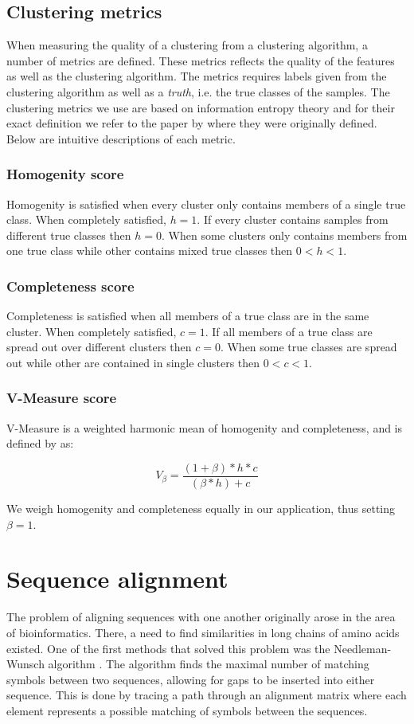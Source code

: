 \documentclass[a4paper]{report}
\begin{document}
\subsection{Clustering metrics}
\label{sec:metrics}
When measuring the quality of a clustering from a clustering algorithm, a
number of metrics are defined. These metrics reflects the quality of the
features as well as the clustering algorithm. The metrics requires labels
given from the clustering algorithm as well as a \emph{truth}, i.e. the true
classes of the samples. The clustering metrics we use are based on information
entropy theory and for their exact definition we refer to the paper by
\citet{rosenberg07} where they were originally defined. Below are intuitive
descriptions of each metric.

\subsubsection{Homogenity score}
Homogenity is satisfied when every cluster only contains members of a single
true class. When completely satisfied, $h = 1$. If every cluster contains
samples from different true classes then $h = 0$. When some clusters only
contains members from one true class while other contains mixed true classes
then $0 < h < 1$.

\subsubsection{Completeness score}
Completeness is satisfied when all members of a true class are in the same
cluster. When completely satisfied, $c = 1$. If all members of a true class
are spread out over different clusters then $c = 0$. When some true classes
are spread out while other are contained in single clusters then
$0 < c < 1$.

\subsubsection{V-Measure score}
V-Measure is a weighted harmonic mean of homogenity and completeness, and
is defined by \citeauthor{rosenberg07} as:

\[
    V_{\beta} = \frac{(1 + \beta) * h * c}{(\beta * h) + c}
\]

We weigh homogenity and completeness equally in our application, thus setting
$\beta = 1$.

\section{Sequence alignment}
The problem of aligning sequences with one another originally arose in the area
of bioinformatics. There, a need to find similarities in long chains of amino
acids existed. One of the first methods that solved this problem was the
Needleman-Wunsch algorithm \citep{needleman70}. The algorithm finds the maximal
number of matching symbols between two sequences, allowing for gaps to be
inserted into either sequence. This is done by tracing a path through an
alignment matrix where each element represents a possible matching of symbols
between the sequences.
\end{document}
